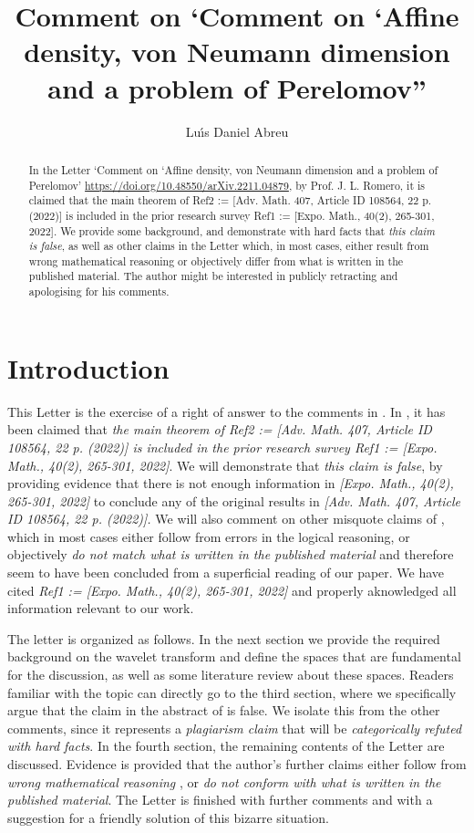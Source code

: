 \documentclass[11pt,reqno]{amsart}
\title[Comment on `Comment on ....']{Comment on `Comment on `Affine density,
von Neumann dimension and a problem of Perelomov\textquotedblright }
\author{Lu\'{\i}s Daniel Abreu}
\numberwithin{equation}{section}
\theoremstyle{plain}
\theoremstyle{definition}
\theoremstyle{remark}
\begin{document}
\maketitle

\begin{abstract}
In the Letter `Comment on `Affine density, von Neumann dimension and a
problem of Perelomov' \url{https://doi.org/10.48550/arXiv.2211.04879}, by
Prof. J. L. Romero, it is claimed that the main theorem of Ref2 := [Adv.
Math. 407, Article ID 108564, 22 p. (2022)] is included in the prior
research survey Ref1 := [Expo. Math., 40(2), 265-301, 2022]. We provide some
background, and demonstrate with hard facts that \emph{this claim is false},
as well as other claims in the Letter which, in most cases, either result
from wrong mathematical reasoning or objectively differ from what is written
in the published material. The author might be interested in publicly
retracting and apologising for his comments.
\end{abstract}

\section{\textbf{Introduction}}

This Letter is the exercise of a right of answer to the comments in \cite%
{Letter}. In \cite{Letter}, it has been claimed that \emph{the main theorem
of Ref2 := [Adv. Math. 407, Article ID 108564, 22 p. (2022)] is included in
the prior research survey Ref1 := [Expo. Math., 40(2), 265-301, 2022]}. We
will demonstrate that \emph{this claim is false}, by providing evidence that
there is not enough information in \emph{[Expo. Math., 40(2), 265-301, 2022] 
}to conclude any of the original results in \emph{[Adv. Math. 407, Article
ID 108564, 22 p. (2022)]. }We will also comment on other misquote claims of 
\cite{Letter}, which in most cases either follow from errors in the logical
reasoning, or objectively \emph{do not match what is written in the
published material} and therefore seem to have been concluded from a
superficial reading of our paper. We have cited \emph{Ref1 := [Expo. Math.,
40(2), 265-301, 2022]} and properly aknowledged all information relevant to
our work.

The letter is organized as follows. In the next section we provide the
required background on the wavelet transform and define the spaces that are
fundamental for the discussion, as well as some literature review about
these spaces. Readers familiar with the topic can directly go to the third
section, where we specifically argue that the claim in the abstract of \cite%
{Letter} is false. We isolate this from the other comments, since it
represents a \emph{plagiarism claim} that will be \emph{categorically
refuted with hard facts}. In the fourth section, the remaining contents of
the Letter \cite{Letter} are discussed. Evidence is provided that the
author's further claims either follow from \emph{wrong mathematical reasoning%
}, or \emph{do not conform with what is written in the published material}.
The Letter is finished with further comments and with a suggestion for a
friendly solution of this bizarre situation.
\end{document}
